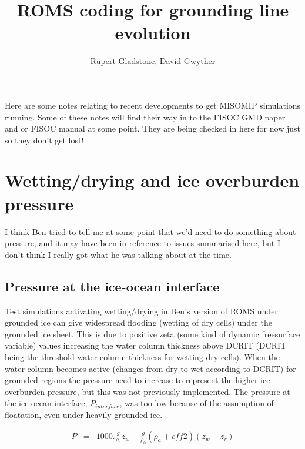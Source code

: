 \documentclass[12pt]{article}
\begin{document}
\title{ROMS coding for grounding line evolution}
\author{Rupert Gladstone, David Gwyther}
\maketitle{}

Here are some notes relating to recent developments to get MISOMIP simulations running. Some of these notes will find their way in to the FISOC 
GMD paper and or FISOC manual at some point.  They are being checked in here for now just so they don't get lost!


\section{Wetting/drying and ice overburden pressure}

I think Ben tried to tell me at some point that we'd need to do something about pressure, and it may have been in reference to  issues
summarised here, but I don't think I really got what he was talking about at the time.




\subsection{Pressure at the ice-ocean interface}

Test simulations activating wetting/drying in Ben's version of ROMS under grounded ice can give widespread flooding (wetting of dry cells) 
under the grounded ice sheet.
This is due to positive zeta (some kind of dynamic freesurface variable) values increasing the water column thickness above DCRIT (DCRIT being the threshold 
water column thickness for wetting dry cells). 
When the water column becomes active (changes from dry to wet according to DCRIT) for grounded regions the pressure need to increase to represent the 
higher ice overburden pressure, but this was not previously implemented.
The pressure at the ice-ocean interface, $P_{interface}$, was too low because of the assumption of floatation, even under heavily 
grounded ice.  


\begin{eqnarray}
P & = & 1000. \frac{g}{\rho_0}z_w + \frac{g}{\rho_0}(\rho_a+cff2)(z_w-z_r)
\end{eqnarray}
\end{document}
